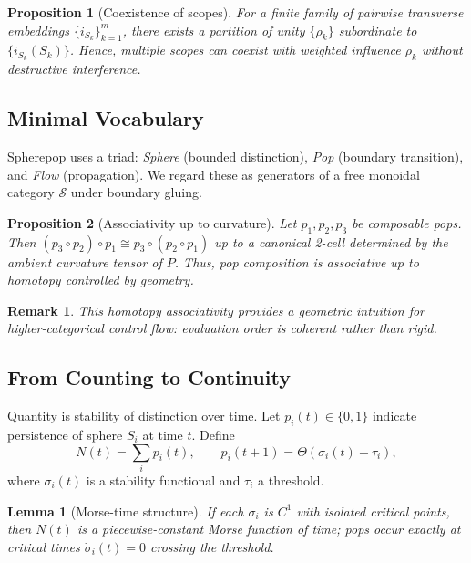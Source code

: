 \documentclass[12pt]{article}
\newtheorem{proposition}{Proposition}
\newtheorem{lemma}{Lemma}
\newtheorem{remark}{Remark}
\begin{document}
\begin{proposition}[Coexistence of scopes]
For a finite family of pairwise transverse embeddings \(\{i_{S_k}\}_{k=1}^m\), there exists a partition of unity \(\{\rho_k\}\) subordinate to \(\{i_{S_k}(S_k)\}\). Hence, multiple scopes can coexist with weighted influence \(\rho_k\) without destructive interference.
\end{proposition}

\subsection{Minimal Vocabulary}
Spherepop uses a triad: \emph{Sphere} (bounded distinction), \emph{Pop} (boundary transition), and \emph{Flow} (propagation). We regard these as generators of a free monoidal category \(\mathcal{S}\) under boundary gluing.

\begin{proposition}[Associativity up to curvature]
Let \(p_1,p_2,p_3\) be composable pops. Then \((p_3\circ p_2)\circ p_1 \cong p_3\circ(p_2\circ p_1)\) up to a canonical 2-cell determined by the ambient curvature tensor of \(P\). Thus, pop composition is associative up to homotopy controlled by geometry.
\end{proposition}

\begin{remark}
This homotopy associativity provides a geometric intuition for higher-categorical control flow: evaluation order is coherent rather than rigid.
\end{remark}

\subsection{From Counting to Continuity}
Quantity is stability of distinction over time. Let \(p_i(t)\in\{0,1\}\) indicate persistence of sphere \(S_i\) at time \(t\). Define
\begin{equation}
N(t)=\sum_i p_i(t),\qquad p_i(t+1)=\Theta(\sigma_i(t)-\tau_i),
\end{equation}
where \(\sigma_i(t)\) is a stability functional and \(\tau_i\) a threshold.

\begin{lemma}[Morse-time structure]
If each \(\sigma_i\) is \(C^1\) with isolated critical points, then \(N(t)\) is a piecewise-constant Morse function of time; pops occur exactly at critical times \(\dot\sigma_i(t)=0\) crossing the threshold.
\end{lemma}
\end{document}
